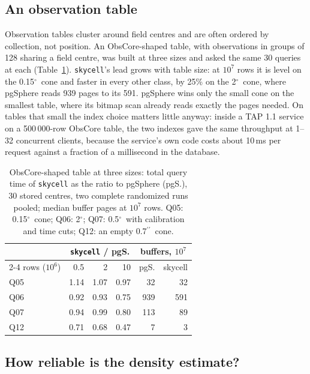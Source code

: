 \documentclass[final,5p,times,twocolumn,authoryear]{elsarticle}
\newcommand{\arcsec}{\ensuremath{^{\prime\prime}}}
\newcommand{\degr}{\ensuremath{^{\circ}}}
\begin{document}
\subsection{An observation table}
\label{sec:tap}

Observation tables cluster around field centres and are often ordered by collection,
not position. An ObsCore-shaped table, with observations in groups of 128 sharing a field centre, was
built at three sizes and asked the same 30 queries at each (Table~\ref{tab:crossover}).
\texttt{skycell}'s lead grows with table size: at $10^7$ rows it is level on the
0.15\degr\ cone and faster in every other class, by 25\% on the 2\degr\ cone, where
pgSphere reads 939 pages to its 591. pgSphere wins only the small cone on the smallest
table, where its bitmap scan already reads exactly the pages needed. On tables that
small the index choice matters little anyway: inside a TAP 1.1 service \citep{egernia} on
a 500\,000-row ObsCore table, the two indexes gave the same throughput at 1--32
concurrent clients, because the service's own code costs about 10\,ms per request
against a fraction of a millisecond in the database.

\begin{table}
  \caption{ObsCore-shaped table at three sizes: total query time of \texttt{skycell} as
    the ratio to pgSphere (pgS.), 30 stored centres, two complete randomized runs
    pooled; median buffer pages at $10^7$ rows. Q05: 0.15\degr\ cone; Q06: 2\degr;
    Q07: 0.5\degr\ with calibration and time cuts; Q12: an empty 0.7\arcsec\ cone.}
  \label{tab:crossover}
  \centering
  \footnotesize
  \setlength{\tabcolsep}{3pt}
  \begin{tabular}{l rrr rr}
    \hline\hline
    & \multicolumn{3}{c}{\texttt{skycell} / pgS.} & \multicolumn{2}{c}{buffers, $10^7$} \\
    \cline{2-4}\cline{5-6}
    rows ($10^6$) & 0.5 & 2 & 10 & pgS. & skycell \\
    \hline
    Q05 & 1.14 & 1.07 & 0.97 &  32 &  32 \\
    Q06 & 0.92 & 0.93 & 0.75 & 939 & 591 \\
    Q07 & 0.94 & 0.99 & 0.80 & 113 &  89 \\
    Q12 & 0.71 & 0.68 & 0.47 &   7 &   3 \\
    \hline
  \end{tabular}
\end{table}

\subsection{How reliable is the density estimate?}
\label{sec:estimator}
\label{sec:ablation}
\end{document}
